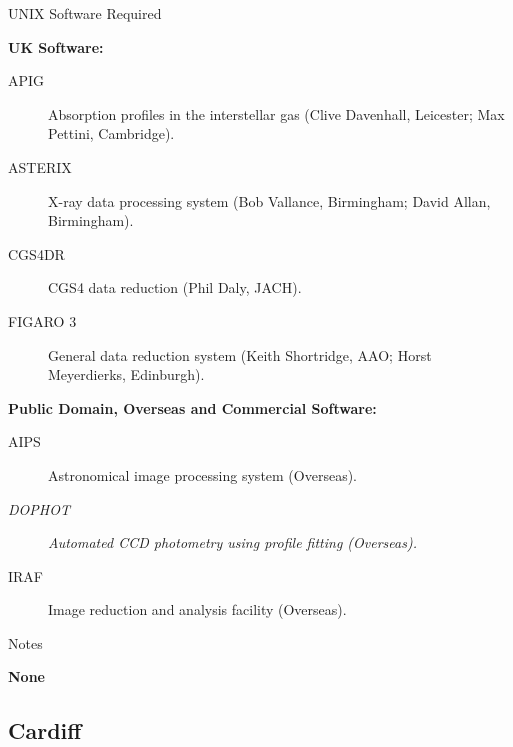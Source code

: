 \vspace{5mm}
\begin{center}
{\large\sc UNIX Software Required}
\end{center}

\begin{center}
{\bf UK Software:}
\end{center}

\begin{description}
\item[APIG] Absorption profiles in the interstellar gas (Clive Davenhall,
Leicester; Max Pettini, Cambridge).
\item[ASTERIX] X-ray data processing system (Bob Vallance, Birmingham; 
David Allan, Birmingham).
\item[CGS4DR] CGS4 data reduction (Phil Daly, JACH).
\item[FIGARO 3] General data reduction system (Keith Shortridge, AAO; Horst
Meyerdierks, Edinburgh).
\end{description}


\newpage
\vspace{5mm}
\begin{center}
{\bf Public Domain, Overseas and Commercial Software:}
\end{center}

\begin{description}
\item[AIPS] Astronomical image processing system (Overseas).
\item[{\em DOPHOT}] {\em Automated CCD photometry using profile fitting 
(Overseas).}
\item[IRAF] Image reduction and analysis facility (Overseas).
\end{description}


\vspace{5mm}
\begin{center}
{\large\sc Notes}
\end{center}

{\bf None}


\newpage
\subsection{Cardiff}

\renewcommand{\starsitename}{Cardiff}
\renewcommand{\starnodename}{CARDIF}

\renewcommand{\starunixdate}{1993 October 1}
\renewcommand{\starupdate}{1993 October 26}

\renewcommand{\starsitetelephone}{0222 874000 Ext. 5282}
\renewcommand{\starsitefax}{0222 874056}

